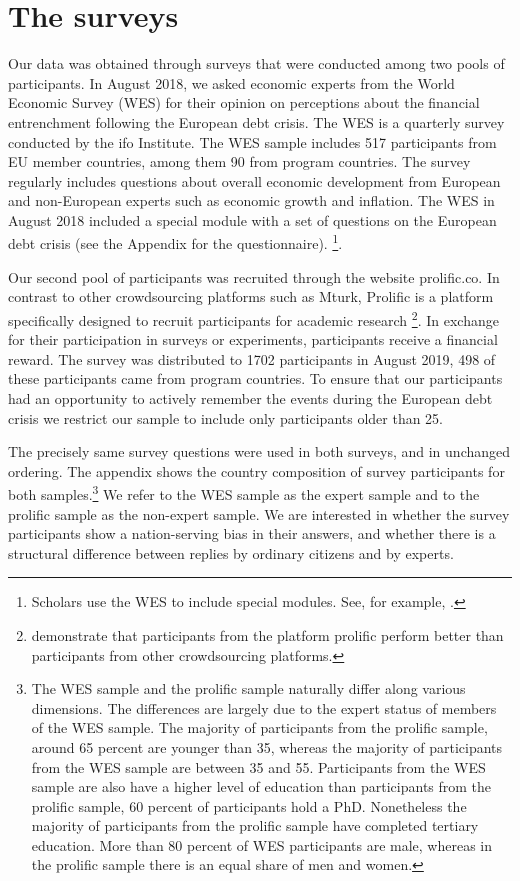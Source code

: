 \section{The surveys }
Our data was obtained through surveys that were conducted among two pools of
participants. In August 2018, we asked economic experts from the World
Economic Survey (WES) for their opinion on perceptions about the financial
entrenchment following the European debt crisis. The WES is a quarterly
survey conducted by the ifo Institute. The WES sample includes 517
participants from EU member countries, among them 90 from program countries.
The survey regularly includes questions about overall economic development
from European and non-European experts such as economic growth and
inflation. The WES in August 2018 included a special module with a set of
questions on the European debt crisis (see the Appendix for the
questionnaire). \footnote{Scholars use the WES to include special modules. See, for example, \cite{mosler}.}.

Our second pool of participants was recruited through the website
prolific.co. In contrast to other crowdsourcing platforms such as Mturk,
Prolific is a platform specifically designed to recruit participants for
academic research \footnote{\cite{Peer} demonstrate that participants from
the platform prolific perform better than participants from other
crowdsourcing platforms.}. In exchange for their participation in surveys or
experiments, participants receive a financial reward. The survey was
distributed to 1702 participants in August 2019, 498 of these participants
came from program countries. To ensure that our participants had an
opportunity to actively remember the events during the European debt crisis
we restrict our sample to include only participants older than 25.

The precisely same survey questions were used in both surveys, and in
unchanged ordering. The appendix shows the country composition of survey
participants for both samples.\footnote{%
The WES sample and the prolific sample naturally differ along various
dimensions. The differences are largely due to the expert status of members
of the WES sample. The majority of participants from the prolific sample,
around 65 percent are younger than 35, whereas the majority of participants
from the WES sample are between 35 and 55. Participants from the WES sample
are also have a higher level of education than participants from the
prolific sample, 60 percent of participants hold a PhD. Nonetheless the
majority of participants from the prolific sample have completed tertiary
education. More than 80 percent of WES participants are male, whereas in the
prolific sample there is an equal share of men and women.} We refer to the
WES sample as the expert sample and to the prolific sample as the non-expert
sample. We are interested in whether the survey participants show a
nation-serving bias in their answers, and whether there is a structural
difference between replies by ordinary citizens and by experts.